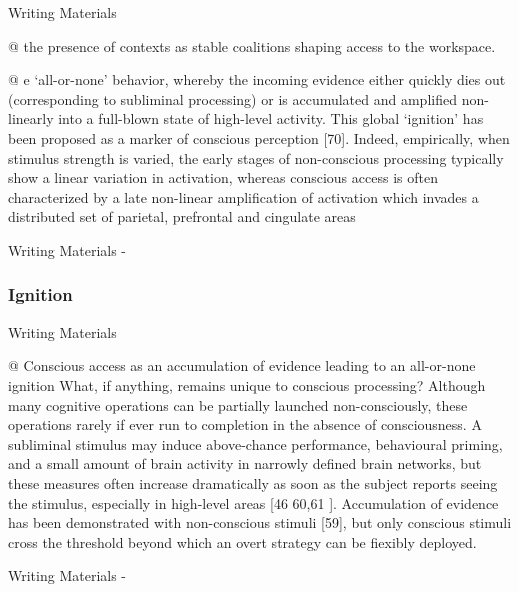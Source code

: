 \documentclass[utf8]{article}
\newenvironment{WritingMaterials} %
    	{
            \begin{tcolorbox}[enhanced,
                title=-,
                size=small,
                colbacktitle=Aquamarine,
                drop fuzzy shadow,
                fontupper=\small,
                boxrule=0.4pt,
                colback=Aquamarine!10!white,
                sharp corners]
                Writing Materials
            \end{tcolorbox}
            \begin{easylist}[itemize]
    	}
    	{
            \end{easylist}  
            \begin{tcolorbox}[enhanced,
                halign=flush right,
                halign title=right,
                size=small,
                colbacktitle=Aquamarine,
                drop fuzzy shadow,
                fontupper=\small,
                boxrule=0.4pt,
                colback=Aquamarine,
                colupper=White,
                sharp corners]
                Writing Materials -
            \end{tcolorbox}        
    	}
\begin{document}
				\begin{WritingMaterials}
					@ the presence of contexts as stable coalitions shaping access to the workspace.

					@ e ‘all-or-none’ behavior, whereby the incoming evidence either quickly dies out (corresponding to subliminal processing) or is accumulated and amplified non-linearly into a full-blown state of high-level activity. This global ‘ignition’ has been proposed as a marker of conscious perception [70]. Indeed, empirically, when stimulus strength is varied, the early stages of non-conscious processing typically show a linear variation in activation, whereas conscious access is often characterized by a late non-linear amplification of activation which invades a distributed set of parietal, prefrontal and cingulate areas
				\end{WritingMaterials}






			\subsubsection{Ignition}
				\begin{WritingMaterials}
					@ Conscious access as an accumulation of evidence leading to an all-or-none ignition What, if anything, remains unique to conscious processing? Although many cognitive operations can be partially launched non-consciously, these operations rarely if ever run to completion in the absence of consciousness. A subliminal stimulus may induce above-chance performance, behavioural priming, and a small amount of brain activity in narrowly defined brain networks, but these measures often increase dramatically as soon as the subject reports seeing the stimulus, especially in high-level areas [46 60,61  ]. Accumulation of evidence has been demonstrated with non-conscious stimuli [59], but only conscious stimuli cross the threshold beyond which an overt strategy can be fiexibly deployed. 
				\end{WritingMaterials}
\end{document}
